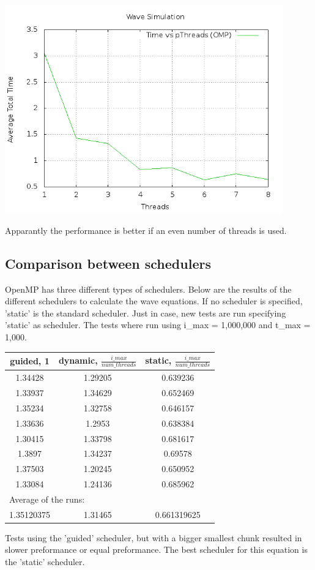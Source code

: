 \documentclass[a4paper]{article}
\begin{document}
    \begin{center}
      \includegraphics[width=0.9\textwidth]{speedplotsolo.png}
    \end{center}
    Apparantly the performance is better if an even number of threads is used.
  \newpage
  \subsection{Comparison between schedulers}
    OpenMP has three different types of schedulers.
    Below are the results of the different
    schedulers to calculate the wave equations. 
    If no scheduler is specified, 'static' is the standard scheduler.
    Just in case, new tests are run specifying 'static' as scheduler.
    The tests where run using i\_max = 1,000,000 and t\_max = 1,000.
    \begin{center}
      \begin{tabular}{| c | c | c |}
      \hline
      guided, 1 & dynamic, $\frac{i\_max}{num\_threads}$ & static, $\frac{i\_max}{num\_threads}$\\
      \hline
      1.34428 & 1.29205 & 0.639236\\
      \hline
      1.33937 & 1.34629 & 0.652469\\
      \hline
      1.35234 & 1.32758 & 0.646157\\
      \hline
      1.33636 & 1.2953 & 0.638384\\
      \hline
      1.30415 & 1.33798 & 0.681617\\
      \hline
      1.3897 & 1.34237 & 0.69578\\
      \hline
      1.37503 & 1.20245 & 0.650952\\
      \hline
      1.33084 & 1.24136 & 0.685962\\
      \hline
      \multicolumn{3}{|l|}{Average of the runs:}\\
      \hline
      1.35120375 & 1.31465 & 0.661319625\\
      \hline
      \end{tabular}
    \end{center}
    Tests using the 'guided' scheduler, but with a bigger smallest chunk resulted
    in slower preformance or equal preformance. The best scheduler for this equation
    is the 'static' scheduler.
    
\end{document}
